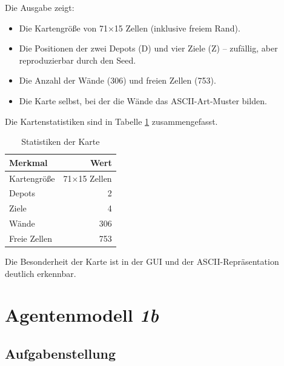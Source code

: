 

Die Ausgabe zeigt:
\begin{itemize}
    \item Die Kartengröße von 71×15 Zellen (inklusive freiem Rand).
    \item Die Positionen der zwei Depots (\acs{D}) und vier Ziele (\acs{Z}) – zufällig, aber reproduzierbar durch den Seed.
    \item Die Anzahl der Wände (306) und freien Zellen (753).
    \item Die Karte selbst, bei der die Wände das \acs{ASCII}-Art-Muster bilden.
\end{itemize}

Die Kartenstatistiken sind in Tabelle \ref{tab:map1a_stats} zusammengefasst.

\begin{table}[H]
    \centering
    \begin{tabular}{l r}
        \toprule
        \textbf{Merkmal} & \textbf{Wert} \\
        \midrule
        Kartengröße & 71×15 Zellen \\
        Depots & 2 \\
        Ziele & 4 \\
        Wände & 306 \\
        Freie Zellen & 753 \\
        \bottomrule
    \end{tabular}
    \caption{Statistiken der Karte}
    \label{tab:map1a_stats}
\end{table}

Die Besonderheit der Karte ist in der \acs{GUI} und der \acs{ASCII}-Repräsentation deutlich erkennbar.


\section{Agentenmodell \textit{1b}}
\label{sec:aufgabe1b}

\subsection{Aufgabenstellung}

